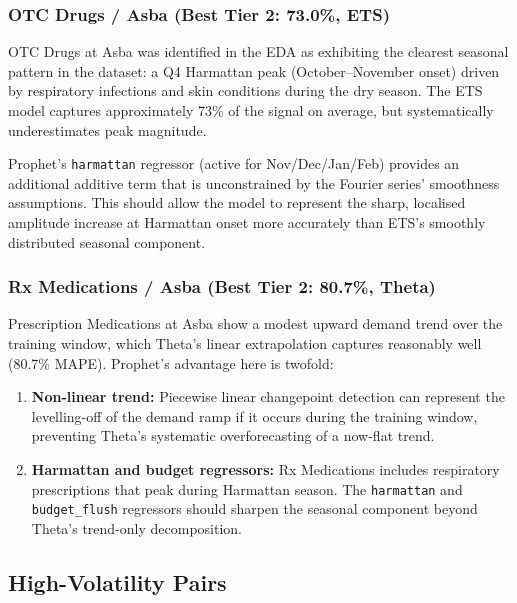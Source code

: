 \documentclass[12pt, a4paper]{article}
\begin{document}
\subsubsection{OTC Drugs / Asba (Best Tier 2: 73.0\%, ETS)}

OTC Drugs at Asba was identified in the EDA as exhibiting the clearest
seasonal pattern in the dataset: a Q4 Harmattan peak (October--November
onset) driven by respiratory infections and skin conditions during the
dry season. The ETS model captures approximately 73\% of the signal on
average, but systematically underestimates peak magnitude.

Prophet's \texttt{harmattan} regressor (active for Nov/Dec/Jan/Feb) provides
an additional additive term that is unconstrained by the Fourier series'
smoothness assumptions. This should allow the model to represent the
sharp, localised amplitude increase at Harmattan onset more accurately
than ETS's smoothly distributed seasonal component.

\subsubsection{Rx Medications / Asba (Best Tier 2: 80.7\%, Theta)}

Prescription Medications at Asba show a modest upward demand trend over
the training window, which Theta's linear extrapolation captures reasonably
well (80.7\% MAPE). Prophet's advantage here is twofold:

\begin{enumerate}[leftmargin=1.5em, itemsep=3pt]
  \item \textbf{Non-linear trend:} Piecewise linear changepoint detection
        can represent the levelling-off of the demand ramp if it occurs
        during the training window, preventing Theta's systematic
        overforecasting of a now-flat trend.

  \item \textbf{Harmattan and budget regressors:} Rx Medications includes
        respiratory prescriptions that peak during Harmattan season. The
        \texttt{harmattan} and \texttt{budget\_flush} regressors should
        sharpen the seasonal component beyond Theta's trend-only
        decomposition.
\end{enumerate}

\subsection{High-Volatility Pairs}
\end{document}
